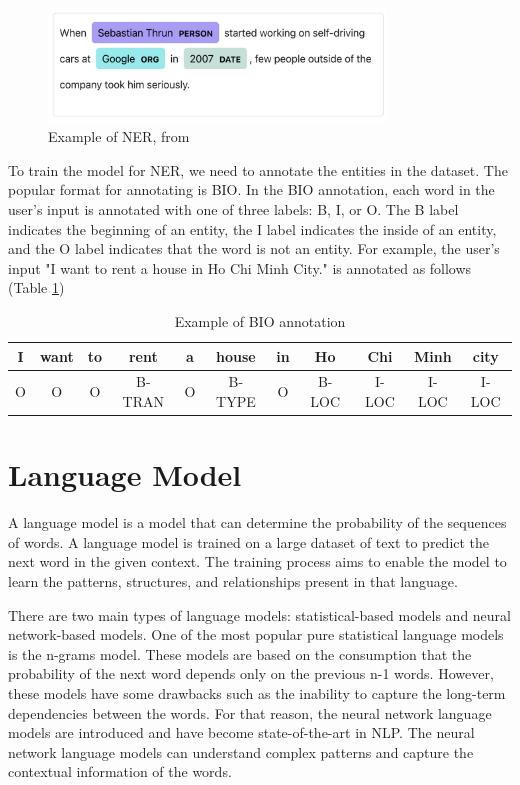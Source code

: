 \begin{figure}[ht]
    \centering
    \includegraphics[width=0.8\textwidth]{Images/5.Theoretical_Background/ner_example.png}
    \caption{Example of NER, from \cite{spacy-visualizer-doc}}
    \label{fig:ner_example}
\end{figure}


To train the model for NER, we need to annotate the entities in the dataset. The popular format for annotating is BIO. In the BIO annotation, each word in the user's input is annotated with one of three labels: B, I, or O. The B label indicates the beginning of an entity, the I label indicates the inside of an entity, and the O label indicates that the word is not an entity. For example, the user's input "I want to rent a house in Ho Chi Minh City." is annotated as follows (Table \ref{tab:bio_annotation})

\begin{table}[ht]
    \centering
    \begin{tabular}{|c|c|c|c|c|c|c|c|c|c|c|}
        \hline
        I & want & to & rent & a & house & in & Ho & Chi & Minh & city \\    
        \hline
        O & O    & O  & B-TRAN & O & B-TYPE & O  & B-LOC    & I-LOC & I-LOC & I-LOC \\
        \hline
    \end{tabular}
    \caption{Example of BIO annotation}
    \label{tab:bio_annotation}
\end{table}

\section{Language Model}
A language model is a model that can determine the probability of the sequences of words. A language model is trained on a large dataset of text to predict the next word in the given context. The training process aims to enable the model to learn the patterns, structures, and relationships present in that language. 

There are two main types of language models: statistical-based models and neural network-based models. One of the most popular pure statistical language models is the n-grams model. These models are based on the consumption that the probability of the next word depends only on the previous n-1 words. However, these models have some drawbacks such as the inability to capture the long-term dependencies between the words. For that reason, the neural network language models are introduced and have become state-of-the-art in NLP. The neural network language models can understand complex patterns and capture the contextual information of the words.

